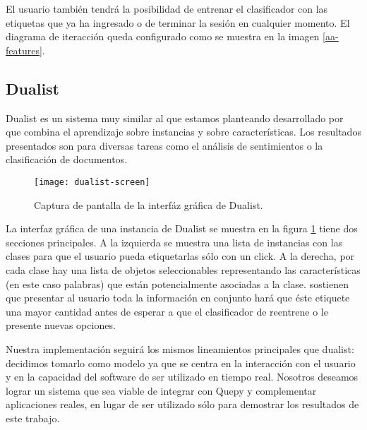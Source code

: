 El usuario también tendrá la posibilidad de entrenar el clasificador con las etiquetas que ya ha ingresado o de terminar la sesión en cualquier momento. El diagrama de iteracción queda configurado como se muestra en la imagen \ref{aa-features}.


\subsection{Dualist}

Dualist es un sistema muy similar al que estamos planteando desarrollado por \citet{dualist} que combina el aprendizaje sobre instancias y sobre características. Los resultados presentados son para diversas tareas como el análisis de sentimientos o la clasificación de documentos.

\begin{figure}[h]\label{figura-dualist}
\caption{Captura de pantalla de la interfáz gráfica de Dualist.}
\texttt{[image: dualist-screen]}
\centering
\end{figure}

La interfaz gráfica de una instancia de Dualist se muestra en la figura \ref{figura-dualist} tiene dos secciones principales. A la izquierda se muestra una lista de instancias con las clases para que el usuario pueda etiquetarlas sólo con un click. A la derecha, por cada clase hay una lista de objetos seleccionables representando las características (en este caso palabras) que están potencialmente asociadas a la clase. \citet{dualist} sostienen que presentar al usuario toda la información en conjunto hará que éste etiquete una mayor cantidad antes de esperar a que el clasificador de reentrene o le presente nuevas opciones.

Nuestra implementación seguirá los mismos lineamientos principales que dualist: decidimos tomarlo como modelo ya que se centra en la interacción con el usuario y en la capacidad del software de ser utilizado en tiempo real. Nosotros deseamos lograr un sistema que sea viable de integrar con Quepy y complementar aplicaciones reales, en lugar de ser utilizado sólo para demostrar los resultados de este trabajo.

